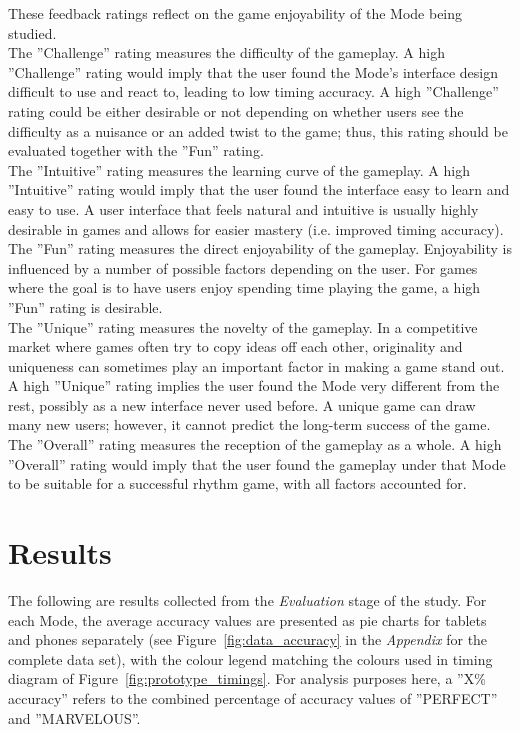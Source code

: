 \documentclass{sig-alternate}
\begin{document}
These feedback ratings reflect on the game enjoyability of the Mode being studied. \\

The ''Challenge'' rating measures the difficulty of the gameplay. A high ''Challenge'' rating would imply that the user found the Mode's interface design difficult to use and react to, leading to low timing accuracy. A high ''Challenge'' rating could be either desirable or not depending on whether users see the difficulty as a nuisance or an added twist to the game; thus, this rating should be evaluated together with the ''Fun'' rating.\\

The ''Intuitive'' rating measures the learning curve of the gameplay. A high ''Intuitive'' rating would imply that the user found the interface easy to learn and easy to use. A user interface that feels natural and intuitive is usually highly desirable in games and allows for easier mastery (i.e. improved timing accuracy).\\

The ''Fun'' rating measures the direct enjoyability of the gameplay. Enjoyability is influenced by a number of possible factors depending on the user. For games where the goal is to have users enjoy spending time playing the game, a high ''Fun'' rating is desirable. \\

The ''Unique'' rating measures the novelty of the gameplay. In a competitive market where games often try to copy ideas off each other, originality and uniqueness can sometimes play an important factor in making a game stand out. A high ''Unique'' rating implies the user found the Mode very different from the rest, possibly as a new interface never used before. A unique game can draw many new users; however, it cannot predict the long-term success of the game. \\

The ''Overall'' rating measures the reception of the gameplay as a whole. A high ''Overall'' rating would imply that the user found the gameplay under that Mode to be suitable for a successful rhythm game, with all factors accounted for.

\section{Results}
\label{sec:results}

The following are results collected from the \textit{Evaluation} stage of the study. For each Mode, the average accuracy values are presented as pie charts for tablets and phones separately (see Figure~\ref{fig:data_accuracy} in the \textit{Appendix} for the complete data set), with the colour legend matching the colours used in timing diagram of Figure~\ref{fig:prototype_timings}. For analysis purposes here, a ''X\% accuracy'' refers to the combined percentage of accuracy values of ''PERFECT'' and ''MARVELOUS''.\\
\end{document}
